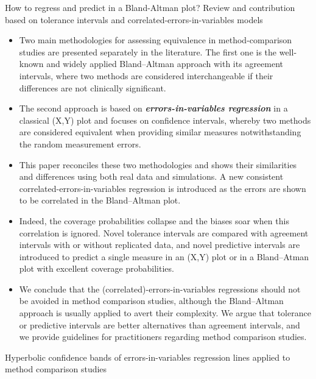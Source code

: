 \newpage

How to regress and predict in a Bland-Altman plot? Review and contribution based on tolerance intervals and correlated-errors-in-variables models

\begin{itemize}
	\item Two main methodologies for assessing equivalence in method-comparison studies are presented separately in the literature. The first one is the well-known and widely applied Bland–Altman approach with its agreement intervals, where two methods are considered interchangeable if their differences are not clinically significant. 
	\item The second approach is based on \textbf{\textit{errors-in-variables regression}} in a classical (X,Y) plot and focuses on confidence intervals, whereby two methods are considered equivalent when providing similar measures notwithstanding the random measurement errors. 
	\item This paper reconciles these two methodologies and shows their similarities and differences using both real data and simulations. A new consistent correlated-errors-in-variables regression is introduced as the errors are shown to be correlated in the Bland–Altman plot. 
	\item Indeed, the coverage probabilities collapse and the biases soar when this correlation is ignored. Novel tolerance intervals are compared with agreement intervals with or without replicated data, and novel predictive intervals are introduced to predict a single measure in an (X,Y) plot or in a Bland–Atman plot with excellent coverage probabilities.
	\item We conclude that the (correlated)-errors-in-variables regressions should not be avoided in method comparison studies, although the Bland–Altman approach is usually applied to avert their complexity. We argue that tolerance or predictive intervals are better alternatives than agreement intervals, and we provide guidelines for practitioners regarding method comparison studies.
	
\end{itemize}
\newpage
Hyperbolic confidence bands of errors-in-variables regression lines applied to method comparison studies

